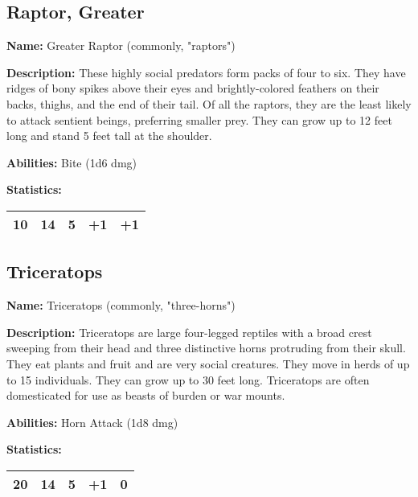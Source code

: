\begin{multicols}{2}
\subsection{Raptor, Greater}

\textbf{Name:} Greater Raptor (commonly, "raptors") 

\textbf{Description:} These highly social predators form packs of four to six. They
have ridges of bony spikes above their eyes and brightly-colored feathers on their
backs, thighs, and the end of their tail. Of all the raptors, they are the least
likely to attack sentient beings, preferring smaller prey. They can grow up to 12
feet long and stand 5 feet tall at the shoulder.

\textbf{Abilities:} Bite (1d6 dmg)

\textbf{Statistics:}

\begin{center}
{
\begin{xtabular}{|l|l|l|l|l|}
10 & 14 & 5 & +1 & +1 \\
\hline
\end{xtabular}
}
\end{center}

\subsection{Triceratops}

\textbf{Name:} Triceratops (commonly, "three-horns") 

\textbf{Description:} Triceratops are large four-legged reptiles with a broad crest sweeping from
their head and three distinctive horns protruding from their skull. They eat plants and fruit and
are very social creatures. They move in herds of up to 15 individuals. They can grow up to 30 feet
long. Triceratops are often domesticated for use as beasts of burden or war mounts.

\textbf{Abilities:} Horn Attack (1d8 dmg)

\textbf{Statistics:}

\begin{center}
{
\begin{xtabular}{|l|l|l|l|l|}
20 & 14 & 5 & +1 & 0 \\
\hline
\end{xtabular}
}
\end{center}


\end{multicols}
